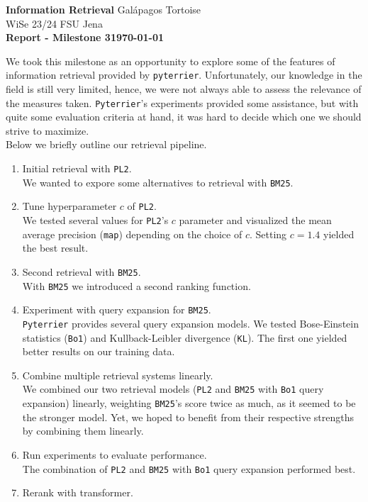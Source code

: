\documentclass[DIN, pagenumber=false, fontsize=11pt, parskip=half]{scrartcl}
\newcommand{\mytitle}[1]{{\noindent\Large\textbf{#1}}}
\begin{document}
\noindent\textbf{Information Retrieval} \hfill Galápagos Tortoise\\
WiSe 23/24 \hfill FSU Jena\\

\mytitle{Report - Milestone 3\hfill \today}


We took this milestone as an opportunity to explore some of the features of information retrieval provided by \texttt{pyterrier}. Unfortunately, our knowledge in the field is still very limited, hence, we were not always able to assess the relevance of the measures taken. \texttt{Pyterrier}'s experiments provided some assistance, but with quite some evaluation criteria at hand, it was hard to decide which one we should strive to maximize.\\ 
Below we briefly outline our retrieval pipeline.\\
\begin{enumerate}
\item Initial retrieval with \texttt{PL2}.\\
We wanted to expore some alternatives to retrieval with \texttt{BM25}.
\item Tune hyperparameter \(c\) of \texttt{PL2}.\\
We tested several values for \texttt{PL2}'s \(c\) parameter and visualized the mean average precision (\texttt{map}) depending on the choice of \(c\). Setting \(c=1.4\) yielded the best result.
\item Second retrieval with \texttt{BM25}.\\
With \texttt{BM25} we introduced a second ranking function.
\item Experiment with query expansion for \texttt{BM25}.\\
\texttt{Pyterrier} provides several query expansion models. We tested Bose-Einstein statistics (\texttt{Bo1}) and Kullback-Leibler divergence (\texttt{KL}). The first one yielded better results on our training data.
\item Combine multiple retrieval systems linearly.\\
We combined our two retrieval models (\texttt{PL2} and \texttt{BM25} with \texttt{Bo1} query expansion) linearly, weighting \texttt{BM25}'s score twice as much, as it seemed to be the stronger model. Yet, we hoped to benefit from their respective strengths by combining them linearly.
\item Run experiments to evaluate performance.\\
The combination of \texttt{PL2} and \texttt{BM25} with \texttt{Bo1} query expansion performed best.
\item Rerank with transformer.
\end{enumerate}
\end{document}
